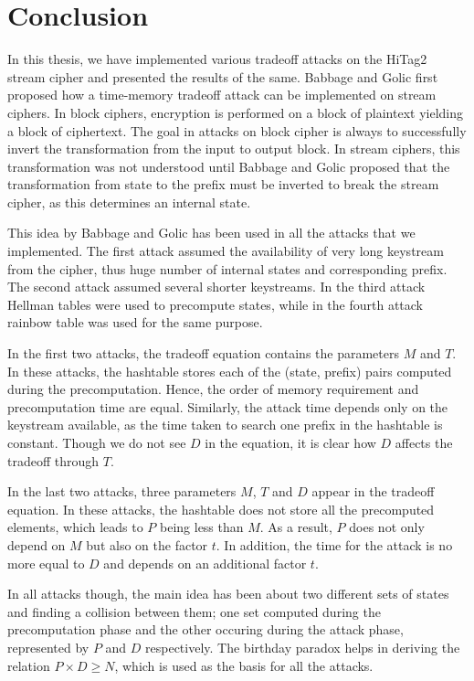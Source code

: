 \chapter{Conclusion}


In this thesis, we have implemented various tradeoff attacks on the HiTag2 stream cipher and presented the results of the same. Babbage and Golic first proposed how a time-memory tradeoff attack can be implemented on stream ciphers. In block ciphers, encryption is performed on a block of plaintext yielding a block of ciphertext. The goal in attacks on block cipher is always to successfully invert the transformation from the input to output block. In stream ciphers, this transformation was not understood until Babbage and Golic proposed that the transformation from state to the prefix must be inverted to break the stream cipher, as this determines an internal state. 

This idea by Babbage and Golic has been used in all the attacks that we implemented. The first attack assumed the availability of very long keystream from the cipher, thus huge number of internal states and corresponding prefix. The second attack assumed several shorter keystreams. In the third attack Hellman tables were used to precompute states, while in the fourth attack rainbow table was used for the same purpose. 

In the first two attacks, the tradeoff equation contains the parameters $M$ and $T$. In these attacks, the hashtable stores each of the (state, prefix) pairs computed during the precomputation. Hence, the order of memory requirement and precomputation time are equal. Similarly, the attack time depends only on the keystream available, as the time taken to search one prefix in the hashtable is constant. Though we do not see $D$ in the equation, it is clear how $D$ affects the tradeoff through $T$.

In the last two attacks, three parameters $M$, $T$ and $D$ appear in the tradeoff equation. In these attacks, the hashtable does not store all the precomputed elements, which leads to $P$ being less than $M$. As a result, $P$ does not only depend on $M$ but also on the factor $t$. In addition, the time for the attack is no more equal to $D$ and depends on an additional factor $t$. 

In all attacks though, the main idea has been about two different sets of states and finding a collision between them; one set computed during the precomputation phase and the other occuring during the attack phase, represented by $P$ and $D$ respectively. The birthday paradox helps in deriving the relation $P \times D \geq N$, which is used as the basis for all the attacks. 

